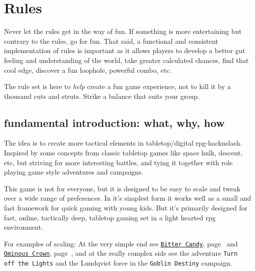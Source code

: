 

%
%


\cleardoublepage



\chapter*{Rules}
Never let the rules get in the way of fun. If something is more entertaining but contrary to the rules, go for fun. That said, a functional and consistent implementation of rules is important as it allows players to develop a better gut feeling and understanding of the world, take greater calculated chances, find that cool edge, discover a fun loophole, powerful combo, etc.

The rule set is here to \emph{help} create a fun game experience, not to kill it by a thousand cuts and struts. Strike a balance that suits your group. 


\section*{fundamental introduction: what, why, how}
The idea is to create more tactical elements in tabletop/digital rpg-hacknslash. Inspired by some concepts from classic tabletop games like space hulk, descent, etc, but striving for more interesting battles, and tying it together with role playing game style adventures and campaigns.

This game is not for everyone, but it is designed to be easy to scale and tweak over a wide range of preferences. In it's simplest form it works well as a small and fast framework for quick gaming with young kids. But it's primarily designed for fast, online, tactically deep, tabletop gaming set in a light hearted rpg environment.

For examples of scaling: At the very simple end see 
\hyperref[sec:youngkids]{\texttt{Bitter Candy}}, page~\pageref{sec:youngkids} and 
\hyperref[sec:basicenough]{\texttt{Ominous Crown}}, page~\pageref{sec:basicenough}, 
and at the really complex side see the adventure 
\texttt{Turn off the Lights} and 
the Lundqvist force in the \texttt{Goblin Destiny} 
campaign.

